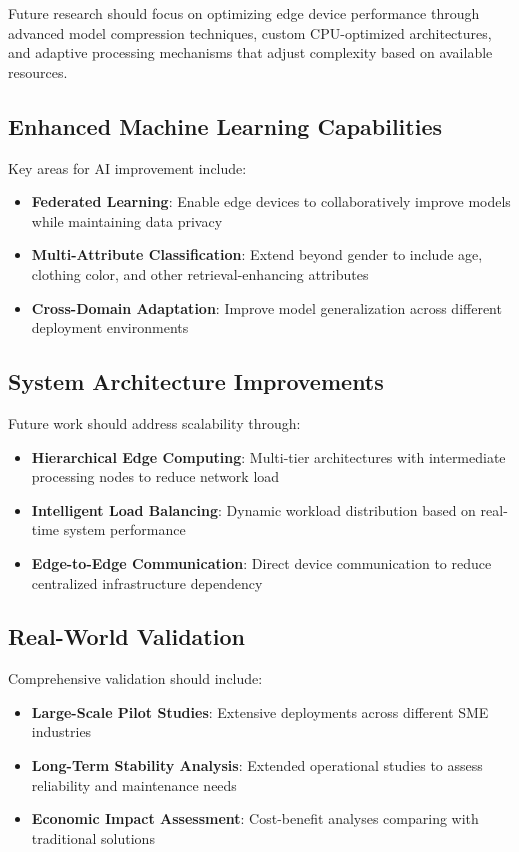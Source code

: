 \documentclass[../main.tex]{subfiles}
\begin{document}
Future research should focus on optimizing edge device performance through advanced model compression techniques, custom CPU-optimized architectures, and adaptive processing mechanisms that adjust complexity based on available resources.

\subsection{Enhanced Machine Learning Capabilities}

Key areas for AI improvement include:

\begin{itemize}
    \item \textbf{Federated Learning}: Enable edge devices to collaboratively improve models while maintaining data privacy
    \item \textbf{Multi-Attribute Classification}: Extend beyond gender to include age, clothing color, and other retrieval-enhancing attributes
    \item \textbf{Cross-Domain Adaptation}: Improve model generalization across different deployment environments
\end{itemize}

\subsection{System Architecture Improvements}

Future work should address scalability through:

\begin{itemize}
    \item \textbf{Hierarchical Edge Computing}: Multi-tier architectures with intermediate processing nodes to reduce network load
    \item \textbf{Intelligent Load Balancing}: Dynamic workload distribution based on real-time system performance
    \item \textbf{Edge-to-Edge Communication}: Direct device communication to reduce centralized infrastructure dependency
\end{itemize}

\subsection{Real-World Validation}

Comprehensive validation should include:

\begin{itemize}
    \item \textbf{Large-Scale Pilot Studies}: Extensive deployments across different SME industries
    \item \textbf{Long-Term Stability Analysis}: Extended operational studies to assess reliability and maintenance needs
    \item \textbf{Economic Impact Assessment}: Cost-benefit analyses comparing with traditional solutions
\end{itemize}
\end{document}
